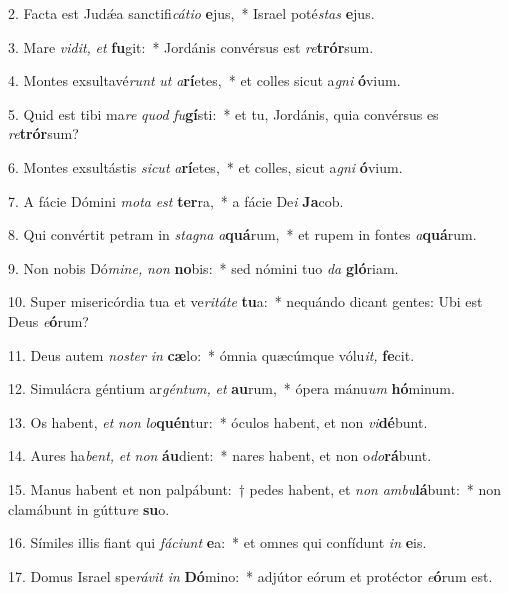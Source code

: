 \item 2. Facta est Judǽa sanctifi\textit{cátio} \textbf{e}jus,~* Israel poté\hspace{0.03em}\textit{stas} \textbf{e}jus.
\item 3. Mare \textit{vidit,} \textit{et} \textbf{fu}git:~* Jordánis convérsus est \textit{re}\textbf{trór}sum.
\item 4. Montes exsultavé\textit{runt} \textit{ut} \textit{a}\textbf{rí}etes,~* et colles sicut a\textit{gni} \textbf{ó}vium.
\item 5. Quid est tibi ma\textit{re} \textit{quod} \textit{fu}\textbf{gí}sti:~* et tu, Jordánis, quia convérsus es \textit{re}\textbf{trór}sum?
\item 6. Montes exsultástis \textit{sicut} \textit{a}\textbf{rí}etes,~* et colles, sicut a\textit{gni} \textbf{ó}vium.
\item 7. A fácie Dómini \textit{mota} \textit{est} \textbf{ter}ra,~* a fácie De\textit{i} \textbf{Ja}cob.
\item 8. Qui convértit petram in \textit{stagna} \textit{a}\textbf{quá}rum,~* et rupem in fontes \textit{a}\textbf{quá}rum.
\item 9. Non nobis Dó\textit{mine,} \textit{non} \textbf{no}bis:~* sed nómini tuo \textit{da} \textbf{gló}riam.
\item 10. Super misericórdia tua et ve\textit{ritáte} \textbf{tu}a:~* nequándo dicant gentes: Ubi est Deus \textit{e}\textbf{ó}rum?
\item 11. Deus autem \textit{noster} \textit{in} \textbf{cæ}lo:~* ómnia quæcúmque vólu\textit{it,} \textbf{fe}cit.
\item 12. Simulácra géntium ar\textit{géntum,} \textit{et} \textbf{au}rum,~* ópera mánu\textit{um} \textbf{hó}minum.
\item 13. Os habent, \textit{et} \textit{non} \textit{lo}\textbf{quén}tur:~* óculos habent, et non \textit{vi}\textbf{dé}bunt.
\item 14. Aures ha\textit{bent,} \textit{et} \textit{non} \textbf{áu}dient:~* nares habent, et non o\textit{do}\textbf{rá}bunt.
\item 15. Manus habent et non palpábunt:~† pedes habent, et \textit{non} \textit{ambu}\textbf{lá}bunt:~* non clamábunt in gúttu\textit{re} \textbf{su}o.
\item 16. Símiles illis fiant qui \textit{fáciunt} \textbf{e}a:~* et omnes qui confídunt \textit{in} \textbf{e}is.
\item 17. Domus Israel spe\textit{rávit} \textit{in} \textbf{Dó}mino:~* adjútor eórum et protéctor \textit{e}\textbf{ó}rum est.
